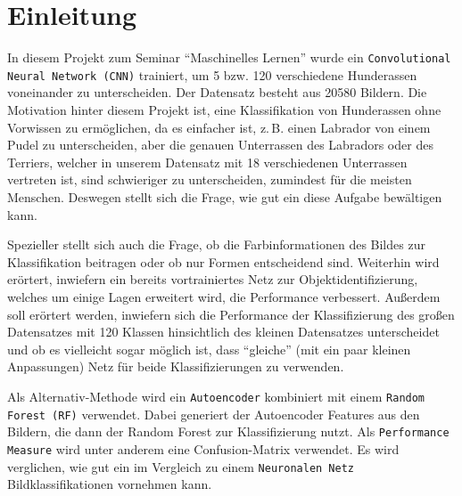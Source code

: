 \chapter{Einleitung}
In diesem Projekt zum Seminar \enquote{Maschinelles Lernen} wurde ein
\texttt{Convolutional Neural Network (CNN)} trainiert, um 5 bzw. 120 verschiedene
Hunderassen voneinander zu unterscheiden. Der Datensatz besteht aus 20580
Bildern\cite{datensatz}. Die Motivation hinter diesem Projekt ist, eine Klassifikation von
Hunderassen ohne Vorwissen zu ermöglichen, da es einfacher ist, z.\,B. einen
Labrador von einem Pudel zu unterscheiden, aber die genauen Unterrassen des
Labradors oder des Terriers, welcher in unserem Datensatz mit 18 verschiedenen
Unterrassen vertreten ist, sind schwieriger zu unterscheiden, zumindest für die meisten
Menschen. Deswegen stellt sich die Frage, wie gut ein \CNN diese Aufgabe bewältigen kann.

Spezieller stellt sich auch die Frage, ob die Farbinformationen des Bildes zur
Klassifikation beitragen oder ob nur Formen entscheidend sind. Weiterhin wird
erörtert, inwiefern ein bereits vortrainiertes Netz zur Objektidentifizierung,
welches um einige Lagen erweitert wird, die Performance verbessert. Außerdem
soll erörtert werden, inwiefern sich die Performance der Klassifizierung des
großen Datensatzes mit 120 Klassen hinsichtlich des kleinen Datensatzes
unterscheidet und ob es vielleicht sogar möglich ist, dass \enquote{gleiche}
(mit ein paar kleinen Anpassungen) Netz für beide Klassifizierungen zu
verwenden.

Als Alternativ-Methode wird ein \texttt{Autoencoder} kombiniert mit einem
\texttt{Random Forest (RF)} verwendet. Dabei generiert der Autoencoder Features
aus den Bildern, die dann der Random Forest zur Klassifizierung nutzt. Als
\texttt{Performance Measure} wird unter anderem eine Confusion-Matrix verwendet.
Es wird verglichen, wie gut ein \RF im Vergleich zu einem \texttt{Neuronalen Netz}
Bildklassifikationen vornehmen kann.
